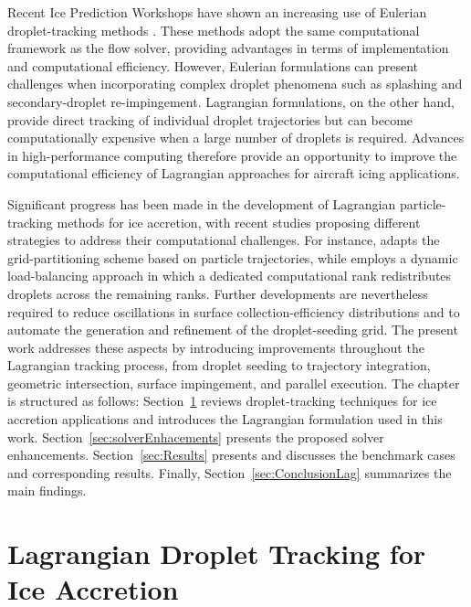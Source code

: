Recent Ice Prediction Workshops \cite{laurendeau2022summary, laurendeau2024summary} have shown an increasing use of Eulerian droplet-tracking methods \cite{ICEPAC, JAXA, FENSAP, ONERA, CIRA}. These methods adopt the same computational framework as the flow solver, providing advantages in terms of implementation and computational efficiency. However, Eulerian formulations can present challenges when incorporating complex droplet phenomena such as splashing and secondary-droplet re-impingement. Lagrangian formulations, on the other hand, provide direct tracking of individual droplet trajectories but can become computationally expensive when a large number of droplets is required. Advances in high-performance computing therefore provide an opportunity to improve the computational efficiency of Lagrangian approaches for aircraft icing applications.

Significant progress has been made in the development of Lagrangian particle-tracking methods for ice accretion, with recent studies proposing different strategies to address their computational challenges. For instance, \cite{BALDAN2023105856} adapts the grid-partitioning scheme based on particle trajectories, while \cite{sabri2024study} employs a dynamic load-balancing approach in which a dedicated computational rank redistributes droplets across the remaining ranks. Further developments are nevertheless required to reduce oscillations in surface collection-efficiency distributions \cite{Moula_2023} and to automate the generation and refinement of the droplet-seeding grid. The present work addresses these aspects by introducing improvements throughout the Lagrangian tracking process, from droplet seeding to trajectory integration, geometric intersection, surface impingement, and parallel execution. The chapter is structured as follows: Section~\ref{sec:subsec1} reviews droplet-tracking techniques for ice accretion applications and introduces the Lagrangian formulation used in this work. Section~\ref{sec:solverEnhacements} presents the proposed solver enhancements. Section~\ref{sec:Results} presents and discusses the benchmark cases and corresponding results. Finally, Section~\ref{sec:ConclusionLag} summarizes the main findings.

\section{Lagrangian Droplet Tracking for Ice Accretion}
\label{sec:subsec1}

